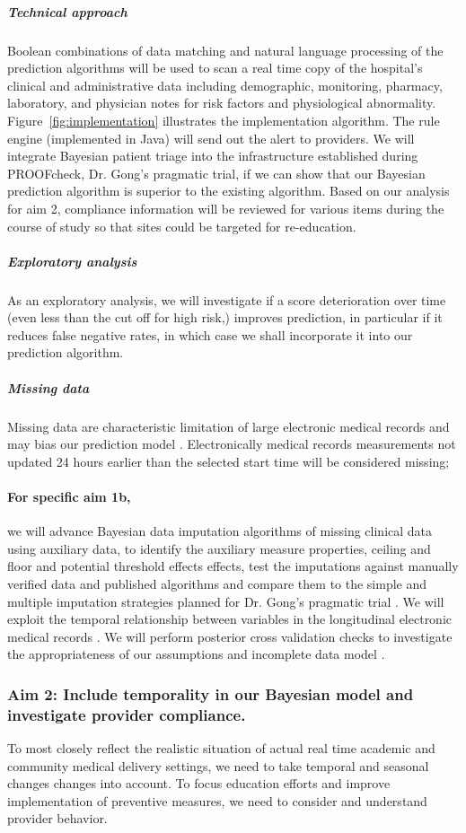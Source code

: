 \documentclass[11pt,notitlepage]{article}
\begin{document}
\subparagraph*{Technical approach}
Boolean combinations of data matching and natural language processing of the prediction algorithms will be used to scan a real time copy of the hospital's clinical and administrative data including demographic, monitoring, pharmacy, laboratory, and physician notes for risk factors and physiological abnormality. Figure~\ref{fig:implementation} illustrates the implementation algorithm. The rule engine (implemented in Java) will send out the alert to providers.
We will integrate Bayesian patient triage into the infrastructure established during PROOFcheck, Dr. Gong's pragmatic trial, if we can show that our Bayesian prediction algorithm is superior to the existing algorithm. Based on our analysis for aim 2, compliance information will be reviewed for various items during the course of study so that sites could be targeted for re-education.


\subparagraph{Exploratory analysis}
As an exploratory analysis, we will investigate if a score deterioration over time (even less than the cut off for high risk,) improves prediction, in particular if it reduces false negative rates, in which case we shall incorporate it into our prediction algorithm.

\subparagraph*{Missing data}
Missing data are characteristic limitation of large electronic medical records and may bias our prediction model \cite{Dean_19279318}. Electronically medical records measurements not updated 24 hours earlier than the selected start time will be considered missing; 

\paragraph*{For specific aim 1b,}
we will advance Bayesian data imputation algorithms of missing clinical data using auxiliary data, to identify the auxiliary measure properties, ceiling and floor and potential threshold effects effects, test the imputations against manually verified data and published algorithms and compare them to the simple and multiple imputation strategies planned for Dr. Gong's pragmatic trial \cite{Huntington_16311133,Sloan_15027501}. We will exploit the temporal relationship between variables in the longitudinal electronic medical records \cite{Welch24782349}. We will perform posterior cross validation checks to investigate the appropriateness of our assumptions and incomplete data model \cite{Gelman1998notasked}.

\subsubsection*{Aim 2: Include temporality in our Bayesian model and investigate provider compliance.}
To most closely reflect the realistic situation of actual real time academic and community medical delivery settings, we need to take temporal and seasonal changes changes into account. To focus education efforts and improve implementation of preventive measures, we need to consider and understand provider behavior. 
\end{document}

